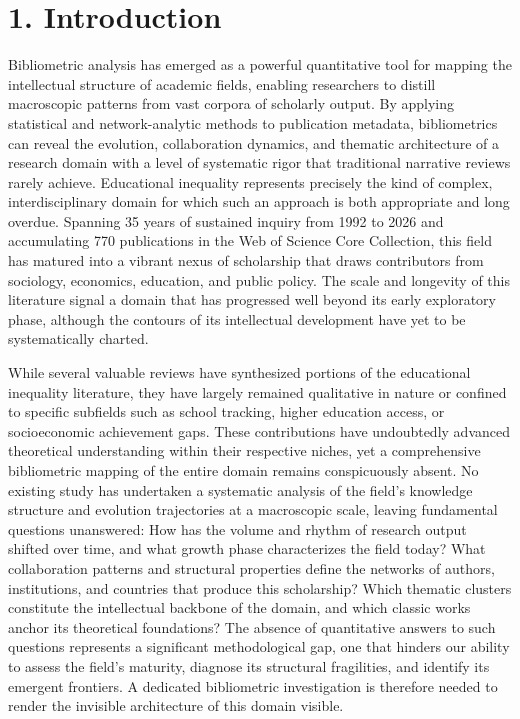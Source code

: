 \documentclass[12pt,a4paper]{article}
\begin{document}
\section{1. Introduction}

Bibliometric analysis has emerged as a powerful quantitative tool for mapping the intellectual structure of academic fields, enabling researchers to distill macroscopic patterns from vast corpora of scholarly output. By applying statistical and network-analytic methods to publication metadata, bibliometrics can reveal the evolution, collaboration dynamics, and thematic architecture of a research domain with a level of systematic rigor that traditional narrative reviews rarely achieve. Educational inequality represents precisely the kind of complex, interdisciplinary domain for which such an approach is both appropriate and long overdue. Spanning 35 years of sustained inquiry from 1992 to 2026 and accumulating 770 publications in the Web of Science Core Collection, this field has matured into a vibrant nexus of scholarship that draws contributors from sociology, economics, education, and public policy. The scale and longevity of this literature signal a domain that has progressed well beyond its early exploratory phase, although the contours of its intellectual development have yet to be systematically charted.

While several valuable reviews have synthesized portions of the educational inequality literature, they have largely remained qualitative in nature or confined to specific subfields such as school tracking, higher education access, or socioeconomic achievement gaps. These contributions have undoubtedly advanced theoretical understanding within their respective niches, yet a comprehensive bibliometric mapping of the entire domain remains conspicuously absent. No existing study has undertaken a systematic analysis of the field's knowledge structure and evolution trajectories at a macroscopic scale, leaving fundamental questions unanswered: How has the volume and rhythm of research output shifted over time, and what growth phase characterizes the field today? What collaboration patterns and structural properties define the networks of authors, institutions, and countries that produce this scholarship? Which thematic clusters constitute the intellectual backbone of the domain, and which classic works anchor its theoretical foundations? The absence of quantitative answers to such questions represents a significant methodological gap, one that hinders our ability to assess the field's maturity, diagnose its structural fragilities, and identify its emergent frontiers. A dedicated bibliometric investigation is therefore needed to render the invisible architecture of this domain visible.
\end{document}
